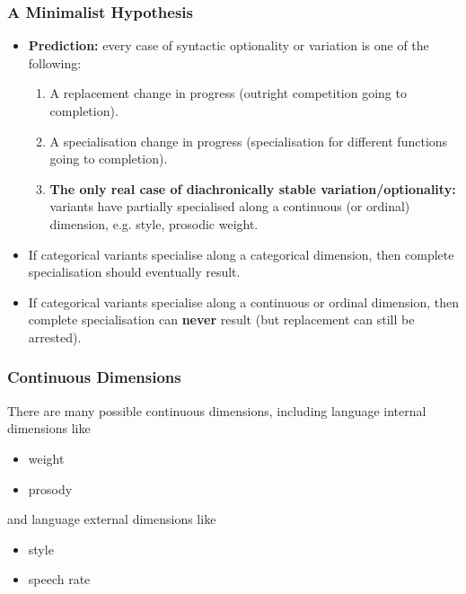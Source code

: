 \documentclass[hyperref={pdfpagelabels=false}]{beamer}
\begin{document}
\begin{frame}
\frametitle{A Minimalist Hypothesis}
\begin{itemize}
	\item \textbf{Prediction:} every case of syntactic optionality or variation is one of the following:
		\begin{enumerate}
			\item A replacement change in progress (outright competition going to completion).
			\item A specialisation change in progress (specialisation for different functions going to completion).
			\item \textbf{The only real case of diachronically stable variation/optionality:} variants have partially specialised along a continuous (or ordinal) dimension, e.g. style, prosodic weight. 
		\end{enumerate}
	\item If categorical variants specialise along a categorical dimension, then complete specialisation should eventually result.
	\item If categorical variants specialise along a continuous or ordinal dimension, then complete specialisation can \textbf{never} result (but replacement can still be arrested).
\end{itemize}

\end{frame}

\begin{frame}
\frametitle{Continuous Dimensions}
There are many possible continuous dimensions, including language internal dimensions like
	\begin{itemize}
		\item weight
		\item prosody
	\end{itemize}
and language external dimensions like
	\begin{itemize}
		\item style
		\item speech rate
	\end{itemize}
\end{frame}
\end{document}
